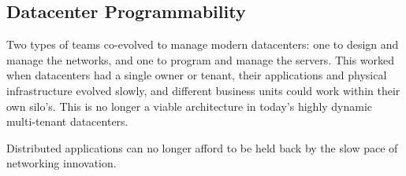 \subsection*{Datacenter Programmability}

Two types of teams co-evolved to manage modern datacenters: one to design and manage the networks, and one to program and manage the servers. This worked %
when datacenters had a single owner or tenant, their applications and physical infrastructure evolved slowly, and different business units could work within their own silo's. %
This is no longer a viable architecture in today's highly dynamic multi-tenant datacenters.

\begin{highlightbox}
\noindent Distributed applications can no longer afford to be held back by the slow pace of networking innovation.
\end{highlightbox}


%
%
%

